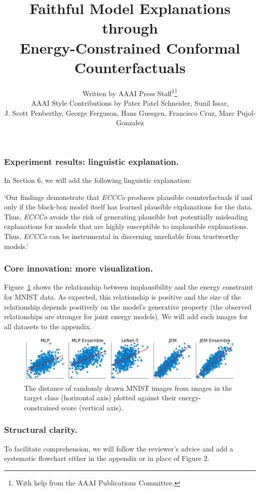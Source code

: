 \documentclass[letterpaper]{article} %
\title{Faithful Model Explanations through\\
Energy-Constrained Conformal Counterfactuals}
\author{
    Written by AAAI Press Staff\textsuperscript{\rm 1}\thanks{With help from the AAAI Publications Committee.}\\
    AAAI Style Contributions by Pater Patel Schneider,
    Sunil Issar,\\
    J. Scott Penberthy,
    George Ferguson,
    Hans Guesgen,
    Francisco Cruz\equalcontrib,
    Marc Pujol-Gonzalez\equalcontrib
}
\begin{document}
\subsubsection{Experiment results: linguistic explanation.} 

In Section 6, we will add the following linguistic explanation: 

`Our findings demonstrate that \textit{ECCCo} produces plausible counterfactuals if and only if the black-box model itself has learned plausible explanations for the data. Thus, \textit{ECCCo} avoids the risk of generating plausible but potentially misleading explanations for models that are highly susceptible to implausible explanations. Thus, \textit{ECCCo} can be instrumental in discerning unreliable from trustworthy models.'

\subsubsection{Core innovation: more visualization.} 

Figure~\ref{fig:poc} shows the relationship between implausibility and the energy constraint for MNIST data. As expected, this relationship is positive and the size of the relationship depends positively on the model's generative property (the observed relationships are stronger for joint energy models). We will add such images for all datasets to the appendix.

\begin{figure}
    \centering
    \includegraphics[width=\linewidth]{../../www/dist_energy.png}
    \caption{The distance of randomly drawn MNIST images from images in the target class (horizontal axis) plotted against their energy-constrained score (vertical axis).}\label{fig:poc}
\end{figure}  

\subsubsection{Structural clarity.} 

To facilitate comprehension, we will follow the reviewer's advice and add a systematic flowchart either in the appendix or in place of Figure 2.
\end{document}
